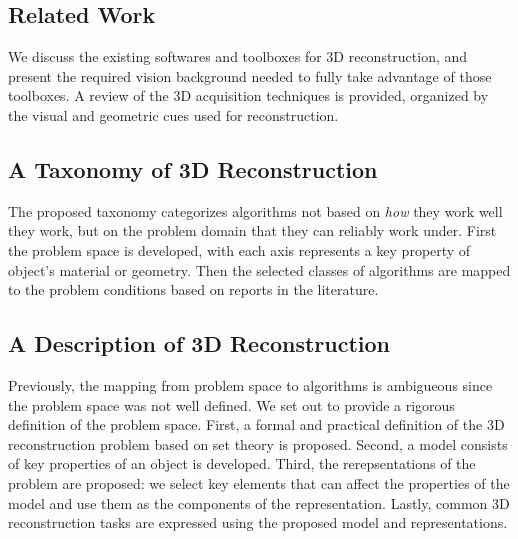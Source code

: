 \subsection{Related Work}
We discuss the existing softwares and toolboxes for 3D reconstruction, and present the required vision background needed to fully take advantage of those toolboxes. A review of the 3D acquisition techniques is provided, organized by the visual and geometric cues used for reconstruction.

\subsection{A Taxonomy of 3D Reconstruction}
The proposed taxonomy categorizes algorithms not based on \textit{how} they work well they work, but on the problem domain that they can reliably work under. First the problem space is developed, with each axis represents a key property of object's material or geometry. Then the selected classes of algorithms are mapped to the problem conditions based on reports in the literature.

\subsection{A Description of 3D Reconstruction}
Previously, the mapping from problem space to algorithms is ambigueous since the problem space was not well defined. We set out to provide a rigorous definition of the problem space. First, a formal and practical definition of the 3D reconstruction problem based on set theory is proposed. Second, a model consists of key properties of an object is developed. Third, the rerepsentations of the problem are proposed: we select key elements that can affect the properties of the model and use them as the components of the representation. Lastly, common 3D reconstruction tasks are expressed using the proposed model and representations.



